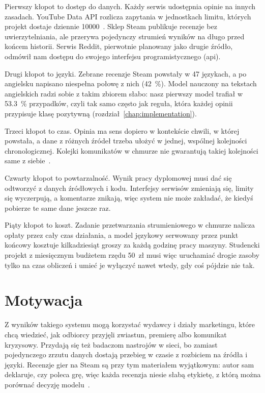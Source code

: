 Pierwszy kłopot to dostęp do danych.
Każdy serwis udostępnia opinie na innych zasadach.
YouTube Data API rozlicza zapytania w jednostkach limitu, których projekt dostaje dziennie \num{10000}~\cite{docyoutubequota}.
Sklep Steam publikuje recenzje bez uwierzytelniania, ale przerywa pojedynczy strumień wyników na długo przed końcem historii.
Serwis Reddit, pierwotnie planowany jako drugie źródło, odmówił nam dostępu do swojego interfejsu programistycznego (\ac{api}).

Drugi kłopot to języki.
Zebrane recenzje Steam powstały w 47 językach, a po angielsku napisano niespełna połowę z nich (\qty{42}{\percent}).
Model nauczony na tekstach angielskich radzi sobie z takim zbiorem słabo: nasz pierwszy model trafiał w \qty{53.3}{\percent} przypadków, czyli tak samo często jak reguła, która każdej opinii przypisuje klasę pozytywną (rozdział~\ref{chap:implementation}).

Trzeci kłopot to czas.
Opinia ma sens dopiero w kontekście chwili, w której powstała, a dane z różnych źródeł trzeba ułożyć w jednej, wspólnej kolejności chronologicznej.
Kolejki komunikatów w chmurze nie gwarantują takiej kolejności same z siebie~\cite{docpubsubordering}.

Czwarty kłopot to powtarzalność.
Wynik pracy dyplomowej musi dać się odtworzyć z danych źródłowych i kodu.
Interfejsy serwisów zmieniają się, limity się wyczerpują, a komentarze znikają, więc system nie może zakładać, że kiedyś pobierze te same dane jeszcze raz.

Piąty kłopot to koszt.
Zadanie przetwarzania strumieniowego w chmurze nalicza opłaty przez cały czas działania, a model językowy serwowany przez punkt końcowy kosztuje kilkadziesiąt groszy za każdą godzinę pracy maszyny.
Studencki projekt z miesięcznym budżetem rzędu 50~zł musi więc uruchamiać drogie zasoby tylko na czas obliczeń i umieć je wyłączyć nawet wtedy, gdy coś pójdzie nie tak.

\section{Motywacja}
\label{sec:intro-motivation}

Z wyników takiego systemu mogą korzystać wydawcy i działy marketingu, które chcą wiedzieć, jak odbiorcy przyjęli zwiastun, premierę albo komunikat kryzysowy.
Przydają się też badaczom nastrojów w sieci, bo zamiast pojedynczego zrzutu danych dostają przebieg w czasie z rozbiciem na źródła i języki.
Recenzje gier na Steam są przy tym materiałem wyjątkowym: autor sam deklaruje, czy poleca grę, więc każda recenzja niesie słabą etykietę, z którą można porównać decyzję modelu~\cite{lin2019empirical}.

